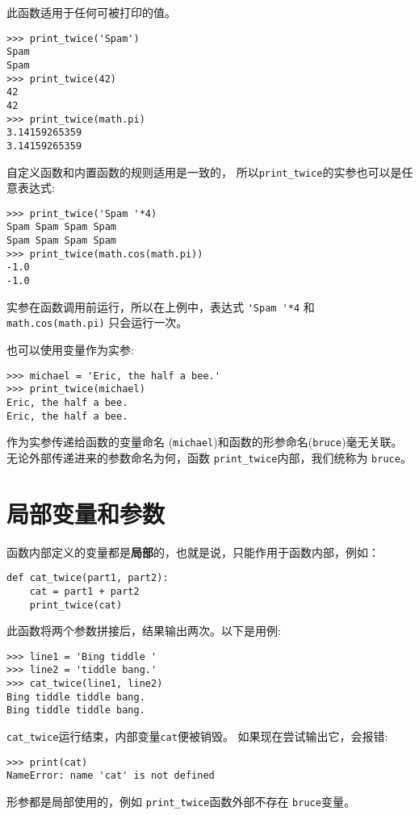 \documentclass[10pt]{book}
\begin{document}
此函数适用于任何可被打印的值。

\begin{verbatim}
>>> print_twice('Spam')
Spam
Spam
>>> print_twice(42)
42
42
>>> print_twice(math.pi)
3.14159265359
3.14159265359
\end{verbatim}
%
自定义函数和内置函数的规则适用是一致的，
所以\verb"print_twice"的实参也可以是任意表达式:

\begin{verbatim}
>>> print_twice('Spam '*4)
Spam Spam Spam Spam
Spam Spam Spam Spam
>>> print_twice(math.cos(math.pi))
-1.0
-1.0
\end{verbatim}
%
实参在函数调用前运行，所以在上例中，表达式 \verb"'Spam '*4" 和
{\tt math.cos(math.pi)} 只会运行一次。

也可以使用变量作为实参:

\begin{verbatim}
>>> michael = 'Eric, the half a bee.'
>>> print_twice(michael)
Eric, the half a bee.
Eric, the half a bee.
\end{verbatim}
%
作为实参传递给函数的变量命名 ({\tt michael})和函数的形参命名({\tt bruce})毫无关联。
无论外部传递进来的参数命名为何，函数 \verb"print_twice"内部，我们统称为 {\tt bruce}。


\section{局部变量和参数}

函数内部定义的变量都是{\bf 局部}的，也就是说，只能作用于函数内部，例如：

\begin{verbatim}
def cat_twice(part1, part2):
    cat = part1 + part2
    print_twice(cat)
\end{verbatim}
%
此函数将两个参数拼接后，结果输出两次。以下是用例:

\begin{verbatim}
>>> line1 = 'Bing tiddle '
>>> line2 = 'tiddle bang.'
>>> cat_twice(line1, line2)
Bing tiddle tiddle bang.
Bing tiddle tiddle bang.
\end{verbatim}
%
\verb"cat_twice"运行结束，内部变量{\tt cat}便被销毁。
如果现在尝试输出它，会报错:

\begin{verbatim}
>>> print(cat)
NameError: name 'cat' is not defined
\end{verbatim}
%
形参都是局部使用的，例如 \verb"print_twice"函数外部不存在 {\tt bruce}变量。
\end{document}
